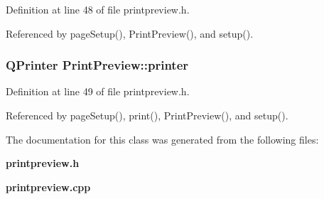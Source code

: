 Definition at line 48 of file printpreview.h.

Referenced by page\-Setup(), Print\-Preview(), and setup().
\subsubsection{\setlength{\rightskip}{0pt plus 5cm}QPrinter {\bf Print\-Preview::printer}\hspace{0.3cm}{\tt  [private]}}\label{classPrintPreview_0d23d4460eeae8054a8498f6e0892727}




Definition at line 49 of file printpreview.h.

Referenced by page\-Setup(), print(), Print\-Preview(), and setup().

The documentation for this class was generated from the following files:\begin{CompactItemize}
\item 
{\bf printpreview.h}\item 
{\bf printpreview.cpp}\end{CompactItemize}
